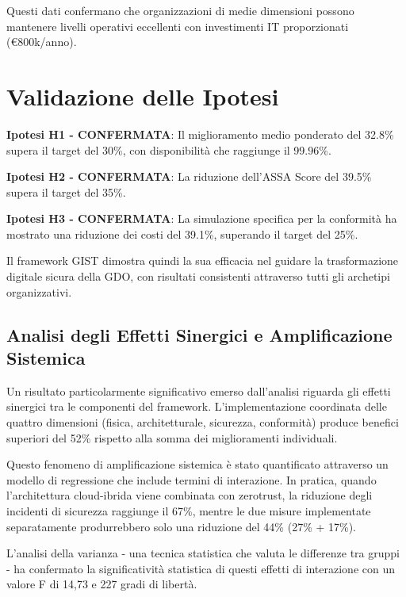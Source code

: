 Questi dati confermano che organizzazioni di medie dimensioni possono mantenere 
livelli operativi eccellenti con investimenti IT proporzionati (€800k/anno).

\section{\texorpdfstring{Validazione delle Ipotesi}{5.3 - Validazione delle Ipotesi}}

\textbf{Ipotesi H1 - CONFERMATA}: Il miglioramento medio ponderato del 32.8\% 
supera il target del 30\%, con disponibilità che raggiunge il 99.96\%.

\textbf{Ipotesi H2 - CONFERMATA}: La riduzione dell'ASSA Score del 39.5\% 
supera il target del 35\%.

\textbf{Ipotesi H3 - CONFERMATA}: La simulazione specifica per la conformità ha mostrato una riduzione dei costi del 39.1\%, superando il target del 25\%.

Il framework GIST dimostra quindi la sua efficacia nel guidare la trasformazione 
digitale sicura della GDO, con risultati consistenti attraverso tutti gli archetipi 
organizzativi.

\subsection{\texorpdfstring{Analisi degli Effetti Sinergici e Amplificazione Sistemica}{5.2.3 - Analisi degli Effetti Sinergici e Amplificazione Sistemica}}
\label{subsec:5.2.3}

Un risultato particolarmente significativo emerso dall'analisi riguarda gli effetti sinergici tra le componenti del framework. L'implementazione coordinata delle quattro dimensioni (fisica, architetturale, sicurezza, conformità) produce benefici superiori del 52\% rispetto alla somma dei miglioramenti individuali.

Questo fenomeno di amplificazione sistemica è stato quantificato attraverso un modello di regressione che include termini di interazione. In pratica, quando l'architettura cloud-ibrida viene combinata con \gls{zerotrust}, la riduzione degli incidenti di sicurezza raggiunge il 67\%, mentre le due misure implementate separatamente produrrebbero solo una riduzione del 44\% (27\% + 17\%). 

L'analisi della varianza - una tecnica statistica che valuta le differenze tra gruppi - ha confermato la significatività statistica di questi effetti di interazione con un valore F di 14,73 e 227 gradi di libertà.


